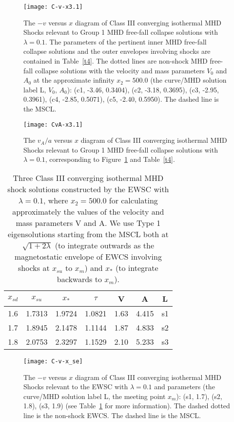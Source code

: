 \documentclass[fleqn,usenatbib]{mnras}
\begin{document}
\begin{figure}
\centering
\texttt{[image: C-v-x3.1]}
\caption{The $-v$ versus $x$ diagram of Class III converging isothermal MHD Shocks relevant to Group 1 MHD free-fall collapse solutions with $\lambda=0.1$. The parameters of the pertinent inner MHD free-fall collapse solutions and the outer envelopes involving shocks are contained in Table~\ref{t4}. The dotted lines are non-shock MHD free-fall collapse solutions with the velocity and mass parameters $V_{0}$ and $A_{0}$ at the approximate infinity $x_{2}=500.0$ (the curve/MHD solution label L, $V_{0}$, $A_{0}$): (c1, -3.46, 0.3404), (c2, -3.18, 0.3695), (c3, -2.95, 0.3961), (c4, -2.85, 0.5071), (c5, -2.40, 0.5950). The dashed line is the MSCL.}
\label{16}
\end{figure}

\begin{figure}
\centering
\texttt{[image: CvA-x3.1]}
\caption{The $v_{A}/a$ versus $x$ diagram of Class III converging isothermal MHD Shocks relevant to Group 1 MHD free-fall collapse solutions with $\lambda=0.1$, corresponding to Figure~\ref{16} and Table~\ref{t4}.}
\label{17}
\end{figure}

\begin{table}
\centering
\caption{Three Class III converging isothermal MHD shock solutions constructed by the EWSC with $\lambda=0.1$, where $x_{2}=500.0$ for calculating approximately the values of the velocity and mass parameters V and A. We use Type 1 eigensolutions starting from the MSCL both at $\sqrt{1+2\lambda}$ (to integrate outwards as the magnetostatic envelope of EWCS involving shocks at $x_{su}$ to $x_{m}$) and $x_{*}$ (to integrate backwards to $x_{m}$).}
\begin{tabular}{ccccccc}
\hline
$x_{sd}$ & $x_{su}$ & $x_{*}$ & $\tau$ & V & A & L\\
\hline
1.6 & 1.7313 & 1.9724 & 1.0821 & 1.63 & 4.415 & s1 \\
1.7 & 1.8945 & 2.1478 & 1.1144 & 1.87 & 4.833 & s2 \\
1.8 & 2.0753 & 2.3297 & 1.1529 & 2.10 & 5.233 & s3 \\
\hline
\end{tabular}
\label{tse}
\end{table}


\begin{figure}
\centering
\texttt{[image: C-v-x\_se]}
\caption{The $-v$ versus $x$ diagram of Class III converging isothermal MHD Shocks relevant to the EWSC with $\lambda=0.1$ and parameters (the curve/MHD solution label L, the meeting point $x_{m}$): (s1, 1.7), (s2, 1.8), (s3, 1.9) (see Table~\ref{tse} for more information). The dashed dotted line is the non-shock EWCS. The dashed line is the MSCL.}
\label{se}
\end{figure}
\end{document}
